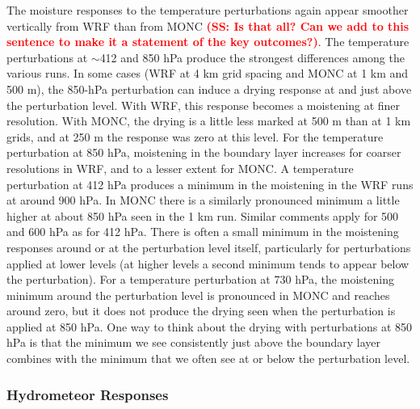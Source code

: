 \documentclass[draft]{agujournal2019}
\newcommand{\todo}[1]{\textcolor{red}{\textbf{(#1)}}}
\begin{document}
The moisture responses to the temperature perturbations again appear smoother
vertically from WRF than from MONC \todo{SS: Is that all?  Can we add to this
sentence to make it a statement of the key outcomes?}. The temperature
perturbations at $\sim$412 and 850 hPa produce the strongest differences among
the various runs. In some cases (WRF at 4 km grid spacing and MONC at 1 km and
500 m), the 850-hPa perturbation can induce a drying response at and just above
the perturbation level. With WRF, this response becomes a moistening at finer
resolution. With MONC, the drying is a little less marked at 500 m than at 1 km
grids, and at 250 m the response was zero at this level. For the temperature
perturbation at 850 hPa, moistening in the boundary layer increases for coarser
resolutions in WRF, and to a lesser extent for MONC. A temperature perturbation
at 412 hPa produces a minimum in the moistening in the WRF runs at around 900
hPa. In MONC there is a similarly pronounced minimum a little higher at about
850 hPa seen in the 1 km run. Similar comments apply for 500 and 600 hPa as for
412 hPa. There is often a small minimum in the moistening responses around or at
the perturbation level itself, particularly for perturbations applied at lower
levels (at higher levels a second minimum tends to appear below the
perturbation). For a temperature perturbation at 730 hPa, the moistening minimum
around the perturbation level is pronounced in MONC and reaches around zero, but
it does not produce the drying seen when the perturbation is applied at 850 hPa.
One way to think about the drying with perturbations at 850 hPa is that the
minimum we see consistently just above the boundary layer combines with the
minimum that we often see at or below the perturbation level.

\subsubsection{Hydrometeor Responses}
\end{document}
